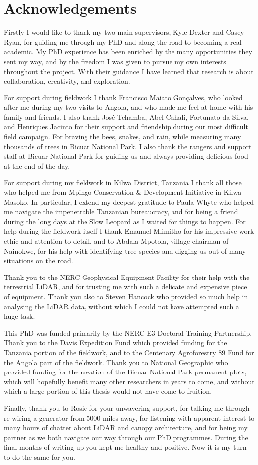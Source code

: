 \chapter*{Acknowledgements}
\label{acknowledgements}

Firstly I would like to thank my two main supervisors, Kyle Dexter and Casey Ryan, for guiding me through my PhD and along the road to becoming a real academic. My PhD experience has been enriched by the many opportunities they sent my way, and by the freedom I was given to pursue my own interests throughout the project. With their guidance I have learned that research is about collaboration, creativity, and exploration. 

For support during fieldwork I thank Francisco Maiato Gon\c{c}alves, who looked after me during my two visits to Angola, and who made me feel at home with his family and friends. I also thank Jos\'{e} Tchamba, Abel Cahali, Fortunato da Silva, and Henriques Jacinto for their support and friendship during our most difficult field campaign. For braving the bees, snakes, and rain, while measuring many thousands of trees in Bicuar National Park. I also thank the rangers and support staff at Bicuar National Park for guiding us and always providing delicious food at the end of the day. 

For support during my fieldwork in Kilwa District, Tanzania I thank all those who helped me from Mpingo Conservation \& Development Initiative in Kilwa Masoko. In particular, I extend my deepest gratitude to Paula Whyte who helped me navigate the impenetrable Tanzanian bureaucracy, and for being a friend during the long days at the Slow Leopard as I waited for things to happen. For help during the fieldwork itself I thank Emanuel Mlimitho for his impressive work ethic and attention to detail, and to Abdala Mpotola, village chairman of Nainokwe, for his help with identifying tree species and digging us out of many situations on the road.

Thank you to the NERC Geophysical Equipment Facility for their help with the terrestrial LiDAR, and for trusting me with such a delicate and expensive piece of equipment. Thank you also to Steven Hancock who provided so much help in analysing the LiDAR data, without which I could not have attempted such a huge task.

This PhD was funded primarily by the NERC E3 Doctoral Training Partnership. Thank you to the Davis Expedition Fund which provided funding for the Tanzania portion of the fieldwork, and to the Centenary Agroforestry 89 Fund for the Angola part of the fieldwork. Thank you to National Geographic who provided funding for the creation of the Bicuar National Park permanent plots, which will hopefully benefit many other researchers in years to come, and without which a large portion of this thesis would not have come to fruition.

Finally, thank you to Rosie for your unwavering support, for talking me through re-wiring a generator from 5000 miles away, for listening with apparent interest to many hours of chatter about LiDAR and canopy architecture, and for being my partner as we both navigate our way through our PhD programmes. During the final months of writing up you kept me healthy and positive. Now it is my turn to do the same for you.
